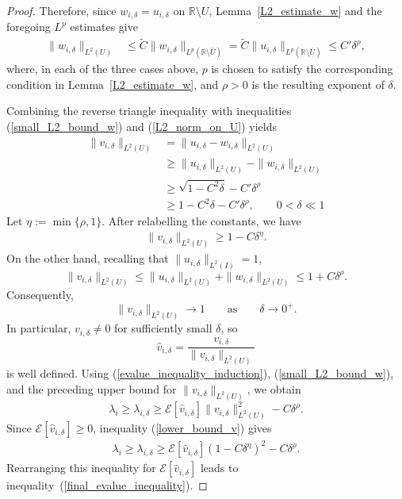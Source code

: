 \documentclass[preprint,12pt]{elsarticle}
\newcommand{\R}{\mathbb R}
\begin{document}
{\begin{proof}

Therefore, since $w_{i,\delta}=u_{i,\delta}$ on
$\R\setminus U$, Lemma~\ref{L2_estimate_w} and the foregoing
$L^p$ estimates give
\begin{align}\label{small_L2_bound_w}
    \|w_{i,\delta}\|_{L^2(U)}
    &\leq
    \widetilde C
    \|w_{i,\delta}\|_{L^p(\R\setminus\overline U)}=
    \widetilde C
    \|u_{i,\delta}\|_{L^p(\R\setminus\overline U)}
    \leq
    C'\delta^\rho,
\end{align}
where, in each of the three cases above, $p$ is chosen to satisfy
the corresponding condition in Lemma~\ref{L2_estimate_w}, and
$\rho>0$ is the resulting exponent of $\delta$.

Combining the reverse triangle inequality with inequalities (\ref{small_L2_bound_w}) and
(\ref{L2_norm_on_U}) yields
\begin{align*}
    \|v_{i,\delta}\|_{L^2(U)}
    &=\|u_{i,\delta}-w_{i,\delta}\|_{L^2(U)}\\
    &\geq
    \|u_{i,\delta}\|_{L^2(U)}
    -\|w_{i,\delta}\|_{L^2(U)}\\
    &\geq\sqrt{1-C^2\delta}-C'\delta^\rho\\
    &\geq 1-C^2\delta-C'\delta^\rho,\qquad 0<\delta\ll 1
\end{align*}
Let $\eta:=\min\{\rho,1\}$. After relabelling the constants, we have
\begin{align}\label{lower_bound_v}
    \|v_{i,\delta}\|_{L^2(U)}
    \geq1-C\delta^\eta.
\end{align}
On the other hand, recalling that $\|u_{i,\delta}\|_{L^2(I)}=1$,
\[
    \|v_{i,\delta}\|_{L^2(U)}
    \leq
    \|u_{i,\delta}\|_{L^2(U)}
    +\|w_{i,\delta}\|_{L^2(U)}
    \leq1+C\delta^\rho.
\]
Consequently,
\[
    \|v_{i,\delta}\|_{L^2(U)}\longrightarrow1\qquad\mbox{as}\qquad\delta\to 0^+.
\]
In particular, $v_{i,\delta}\neq0$ for sufficiently small $\delta$,
so
\[
    \hat v_{i,\delta}
    =
    \frac{v_{i,\delta}}
         {\|v_{i,\delta}\|_{L^2(U)}}
\]
is well defined. Using (\ref{evalue_inequality_induction}),
(\ref{small_L2_bound_w}), and the preceding upper bound for
$\|v_{i,\delta}\|_{L^2(U)}$, we obtain
\[
    \lambda_i
    \geq\lambda_{i,\delta}
    \geq
    \mathcal E[\hat v_{i,\delta}]
    \|v_{i,\delta}\|_{L^2(U)}^2
    -C\delta^\rho.
\]
Since $\mathcal E[\hat v_{i,\delta}]\geq0$, inequality
(\ref{lower_bound_v}) gives
\begin{align*}
    \lambda_i
    \geq\lambda_{i,\delta}
    \geq
    \mathcal E[\hat v_{i,\delta}]
    (1-C\delta^\eta)^2
    -C\delta^\rho.
\end{align*}
Rearranging this inequality for $\mathcal{E}[\hat{v}_{i,\delta}]$ leads to inequality~(\ref{final_evalue_inequality}).


\end{proof}}
\end{document}
